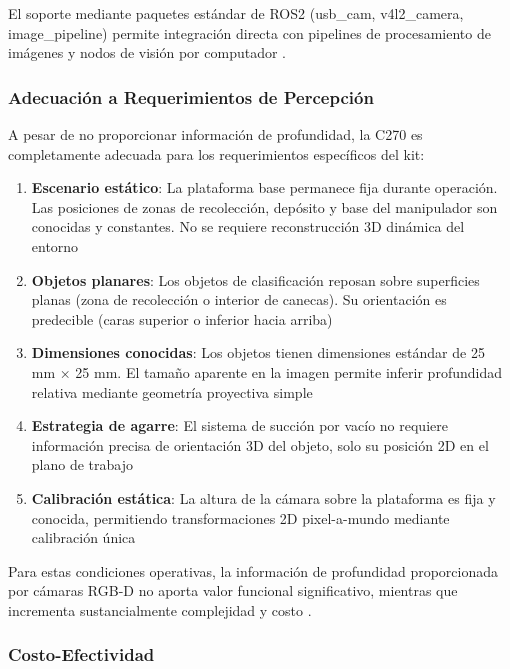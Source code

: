 El soporte mediante paquetes estándar de ROS2 (usb\_cam, v4l2\_camera, image\_pipeline) permite integración directa con pipelines de procesamiento de imágenes y nodos de visión por computador \cite{ROS2Camera2024}.

\subsubsection{Adecuación a Requerimientos de Percepción}

A pesar de no proporcionar información de profundidad, la C270 es completamente adecuada para los requerimientos específicos del kit:

\begin{enumerate}
    \item \textbf{Escenario estático}: La plataforma base permanece fija durante operación. Las posiciones de zonas de recolección, depósito y base del manipulador son conocidas y constantes. No se requiere reconstrucción 3D dinámica del entorno
    
    \item \textbf{Objetos planares}: Los objetos de clasificación reposan sobre superficies planas (zona de recolección o interior de canecas). Su orientación es predecible (caras superior o inferior hacia arriba)
    
    \item \textbf{Dimensiones conocidas}: Los objetos tienen dimensiones estándar de 25 mm × 25 mm. El tamaño aparente en la imagen permite inferir profundidad relativa mediante geometría proyectiva simple
    
    \item \textbf{Estrategia de agarre}: El sistema de succión por vacío no requiere información precisa de orientación 3D del objeto, solo su posición 2D en el plano de trabajo
    
    \item \textbf{Calibración estática}: La altura de la cámara sobre la plataforma es fija y conocida, permitiendo transformaciones 2D pixel-a-mundo mediante calibración única
\end{enumerate}

Para estas condiciones operativas, la información de profundidad proporcionada por cámaras RGB-D no aporta valor funcional significativo, mientras que incrementa sustancialmente complejidad y costo \cite{Corke2017Robotics}.

\subsubsection{Costo-Efectividad}

